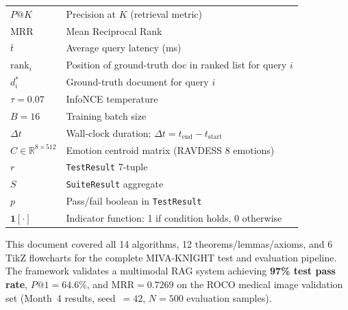 \documentclass[12pt,a4paper]{article}
\begin{document}
\begin{longtable}{p{3.5cm} p{9.5cm}}
$P@K$               & Precision at $K$ (retrieval metric) \\
$\text{MRR}$        & Mean Reciprocal Rank \\
$\bar{t}$           & Average query latency (ms) \\
$\text{rank}_i$     & Position of ground-truth doc in ranked list for query $i$ \\
$d_i^*$             & Ground-truth document for query $i$ \\
$\tau = 0.07$       & InfoNCE temperature \\
$B = 16$            & Training batch size \\
$\Delta t$          & Wall-clock duration; $\Delta t = t_{\text{end}} - t_{\text{start}}$ \\
$C \in \mathbb{R}^{8\times 512}$ & Emotion centroid matrix (RAVDESS 8 emotions) \\
$r$                 & \texttt{TestResult} 7-tuple \\
$S$                 & \texttt{SuiteResult} aggregate \\
$p$                 & Pass/fail boolean in \texttt{TestResult} \\
$\mathbf{1}[\cdot]$ & Indicator function: 1 if condition holds, 0 otherwise \\
\end{longtable}

\vfill

\begin{tcolorbox}[
  colback=lightbluebox!30, colframe=accentblue,
  title=\textbf{Document Summary},
  fonttitle=\bfseries
]
This document covered all 14 algorithms, 12 theorems/lemmas/axioms, and 6 TikZ
flowcharts for the complete MIVA-KNIGHT test and evaluation pipeline.
The framework validates a multimodal RAG system achieving \textbf{97\% test pass rate},
$P@1 = 64.6\%$, and $\text{MRR} = 0.7269$ on the ROCO medical image validation set
(Month~4 results, seed~$= 42$, $N = 500$ evaluation samples).
\end{tcolorbox}
\end{document}
